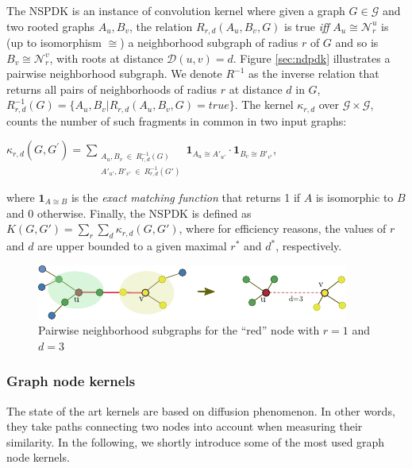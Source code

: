 \documentclass[review]{elsarticle}
\begin{document}
The NSPDK \cite{costa2010fast} is an instance of convolution kernel \cite{haussler1999convolution} where given a graph $G \in \mathcal{G}$ and two rooted graphs $A_u, B_v$, the relation $R_{r,d}(A_u, B_v, G)$ is true {\em iff} $A_u \cong \mathcal{N}_r^u$ is (up to isomorphism $\cong$) a neighborhood subgraph of radius $r$ of $G$ and so is $B_v \cong  \mathcal{N}_r^v$, with roots at distance $\mathcal{D}(u,v)= d$. Figure \ref{sec:ndpdk} illustrates a pairwise neighborhood subgraph. We denote $R^{-1}$ as the inverse relation that returns all pairs of neighborhoods of radius $r$ at distance $d$ in $G$, $R^{-1}_{r,d}(G) = \lbrace A_u, B_v | R_{r,d}(A_u,B_v,G)=true\rbrace$. The kernel $\kappa_{r,d}$ over $\mathcal{G} \times \mathcal{G}$, counts the number of such fragments in common in two input graphs: 
\begin{center}
$\kappa_{r,d}(G,G^{'}) = 
\!\!\!\!\!\!\!\!\!\!\!\! 
\sum\limits_{\substack{A_u, B_v \ \in \ R_{r,d}^{-1}(G) \\ 
{A'}_{u'}, {B'}_{v'} \ \in \ R_{r,d}^{-1}(G')
}} \!\!\!\!\!\!\!\!\!\!\!\!  { { \textbf{1}_{A_{u} \cong A'_{u'}}} \cdot {
\textbf{1}_{B_{v} \cong B'_{v'}}} }$, 
\end{center} 
\noindent where $\textbf{1}_{A \cong B}$ is the \textit{exact matching function} that returns 1 if $A$ is
isomorphic to $B$ and 0 otherwise.  Finally, the NSPDK is defined as $K(G,G') = \sum\limits_{r}{\sum\limits_{d}{\kappa_{r,d}(G,G')}}$, where for efficiency reasons, the values of $r$ and $d$ are upper bounded to a given maximal $r^*$ and $d^*$, respectively.
\begin{figure}
\centering
\includegraphics[width=.9\textwidth]{nspdk}
\caption{Pairwise neighborhood subgraphs for the ``red'' node with $r=1$ and $d=3$}
\label{fig:nspdk}
\end{figure}

\subsubsection{Graph node kernels}
The state of the art kernels are based on diffusion phenomenon. In other words, they take paths connecting two nodes into account when measuring their similarity. In the following, we shortly introduce some of the most used graph node kernels.
\end{document}
